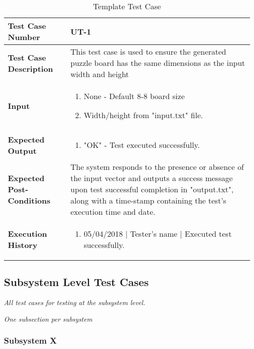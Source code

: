 \documentclass[12pt]{article}
\begin{document}
\def\arraystretch{1.5}%
\begin{table}[htbp]
\centering
\caption{Template Test Case}
\label{UT-1}
\begin{tabularx}{\textwidth}{ | l | X |}
\hline
\textbf{Test Case Number}      &  UT-1                         \\ \hline
\textbf{Test Case Description}    &  This test case is used to ensure the generated puzzle board has the same dimensions as the input width and height                \\ \hline
\textbf{Input}         & 	\begin{enumerate}
	\item None - Default 8-8 board size
	\item  Width/height from "input.txt" file. 
\end{enumerate} \\ \hline

\textbf{Expected Output}     & \begin{enumerate}
	\item "OK" - Test executed successfully.
\end{enumerate} \\ \hline
\textbf{Expected Post-Conditions}           &  The system responds to the presence or absence of the input vector and outputs a success message upon test successful completion in "output.txt", along with a time-stamp containing the test's execution time and date.                    \\ \hline
\textbf{Execution History}   &  \begin{enumerate}
	\item 05/04/2018 | Tester's name | Executed test successfully.
\end {enumerate} \\ \hline
\end{tabularx}
\end{table}
\clearpage


\subsection{Subsystem Level Test Cases}

{\it
All test cases for testing at the subsystem level.
}

{\it
One subsection per subsystem
}

\subsubsection{Subsystem X}
\end{document}
